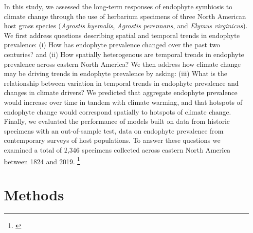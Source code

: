 \documentclass[11pt]{article}
\newcommand{\tom}[2]{{\color{red}{#1}}\footnote{\textit{\color{red}{#2}}}}
\begin{document}
In this study, we assessed the long-term responses of endophyte symbiosis to climate change through the use of herbarium specimens of three North American host grass species (\emph{Agrostis hyemalis}, \emph{Agrostis perennans}, and \emph{Elymus virginicus}).
We first address questions describing spatial and temporal trends in endophyte prevalence: (i) How has endophyte prevalence changed over the past two centuries? and (ii) How spatially heterogenous are temporal trends in endophyte prevalence across eastern North America?
We then address how climate change may be driving trends in endophyte prevalence by asking: (iii) What is the relationship between variation in temporal trends in endophyte prevalence and changes in climate drivers?
We predicted that aggregate endophyte prevalence would increase over time in tandem with climate warming, and that hotspots of endophyte change would correspond spatially to hotspots of climate change. 
Finally, we evaluated the performance of models built on data from historic specimens with an out-of-sample test, data on endophyte prevalence from contemporary surveys of host populations. 
To answer these questions we examined a total of 2,346 specimens collected across eastern North America between 1824 and 2019.
\tom{}{I think the consensus was to keep the out-of-sample validation which should absolutely go into the Intro as an important element of novelty. Should go in the Asbtract too.}
	
\section*{Methods}
\end{document}
